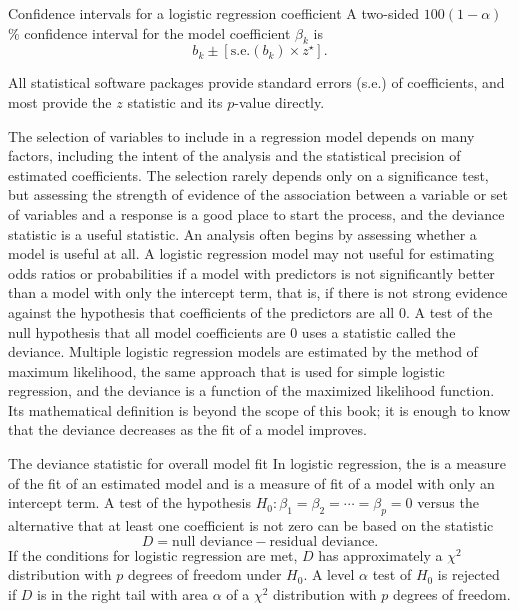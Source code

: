 \begin{onebox}{Confidence intervals for a logistic regression coefficient}
A two-sided $100(1 - \alpha)$\% confidence interval for the model coefficient $\beta_k$ is
\[
  b_k \pm [{\textrm{s.e.}(b_k)} \times z^\star].
\]
\end{onebox}

All statistical software packages provide standard errors (s.e.) of coefficients, and most provide the $z$ statistic and its $p$-value directly.

The selection of variables to include in a regression model depends on many factors, including the intent of the analysis and the statistical precision of estimated coefficients.  The selection rarely depends only on a significance test, but assessing the strength of evidence of the association between a variable or set of variables and a response is a good place to start the process, and the deviance statistic is a useful statistic.  An analysis often begins by assessing whether a model is useful at all.  A logistic regression model may not useful for estimating odds ratios or probabilities if a model with predictors is not significantly better than a model with only the intercept term, that is, if there is not strong evidence against the hypothesis that coefficients of the predictors are all 0.  A test of the null hypothesis that all model coefficients are 0  uses a statistic called the deviance. Multiple logistic regression models are estimated by the method of maximum likelihood, the same approach that is used for simple logistic regression, and the deviance is a function of the maximized likelihood function.  Its mathematical definition is beyond the scope of this book; it is enough to know that the deviance decreases as the fit of a model improves.

\begin{onebox}{The deviance statistic for overall model fit}
  In logistic regression, the  is a measure of the fit of an estimated model and  is a measure of fit of a model with only an intercept term. A test of the hypothesis $H_0:\beta_1 = \beta_2 = \cdots = \beta_p = 0$ versus the alternative that at least one coefficient is not zero can be based on the statistic
  \[
    D =  \text{null deviance} - \text{residual deviance}.
  \]
  If the conditions for logistic regression are met, $D$ has approximately a $\chi^2$ distribution with $p$ degrees of freedom under $H_0$.  A level $\alpha$ test of $H_0$ is rejected if $D$ is in the right tail with area $\alpha$ of a $\chi^2$ distribution with $p$ degrees of freedom.
\end{onebox}

